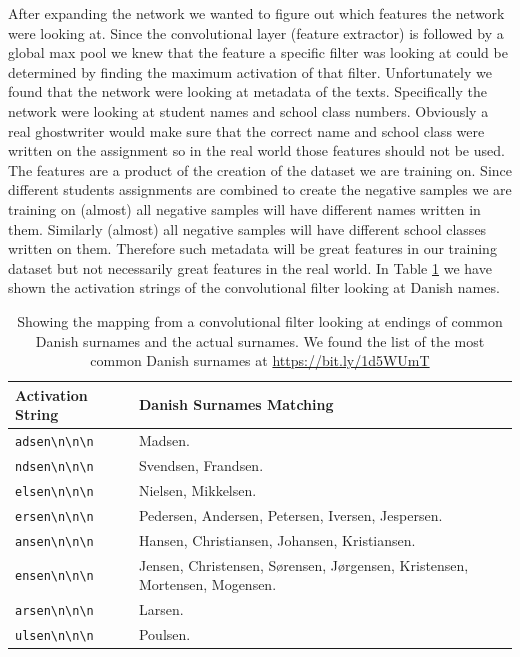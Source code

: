 After expanding the network we wanted to figure out which features the network
were looking at. Since the convolutional layer (feature extractor) is followed
by a global max pool we knew that the feature a specific filter was looking
at could be determined by finding the maximum activation of that filter.
Unfortunately we found that the network were looking at metadata of the texts.
Specifically the network were looking at student names and school class numbers.
Obviously a real ghostwriter would make sure that the correct name and school
class were written on the assignment so in the real world those features should
not be used. The features are a product of the creation of the dataset we are
training on. Since different students assignments are combined to create the
negative samples we are training on (almost) all negative samples will have
different names written in them. Similarly (almost) all negative samples will
have different school classes written on them. Therefore such metadata will be
great features in our training dataset but not necessarily great features in
the real world. In Table \ref{tab:name_features} we have shown the activation
strings of the convolutional filter looking at Danish names.

\begin{table}
    \begin{tabular}{ll}
        \textbf{Activation String} & \textbf{Danish Surnames Matching} \\
        \hline
        \verb!adsen\n\n\n! & Madsen. \\
        \verb!ndsen\n\n\n! & Svendsen, Frandsen. \\
        \verb!elsen\n\n\n! & Nielsen, Mikkelsen. \\
        \verb!ersen\n\n\n! & Pedersen, Andersen, Petersen, Iversen, Jespersen. \\
        \verb!ansen\n\n\n! & Hansen, Christiansen, Johansen, Kristiansen. \\
        \verb!ensen\n\n\n! & Jensen, Christensen, S\o rensen, J\o rgensen,
                             Kristensen, Mortensen, Mogensen. \\
        \verb!arsen\n\n\n! & Larsen. \\
        \verb!ulsen\n\n\n! & Poulsen.
    \end{tabular}
    \caption{Showing the mapping from a convolutional filter looking at endings
        of common Danish surnames and the actual surnames. We found the list of
        the most common Danish surnames at \url{https://bit.ly/1d5WUmT}}
    \label{tab:name_features}
\end{table}

